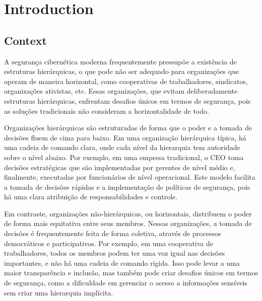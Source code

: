 
%

\chapter{Introduction}
\label{cha:introduction}


% 
% 

\section{Context}
\label{sec:context}

A segurança cibernética moderna frequentemente pressupõe a existência de estruturas hierárquicas,
o que pode não ser adequado para organizações que operam de maneira horizontal, como cooperativas
de trabalhadores, sindicatos, organizações ativistas, etc. Essas organizações, que evitam
deliberadamente estruturas hierárquicas, enfrentam desafios únicos em termos de segurança, pois
as soluções tradicionais não consideram a horizontalidade de todo.

Organizações hierárquicas são estruturadas de forma que o poder e a tomada de decisões fluem de
cima para baixo. Em uma organização hierárquica típica, há uma cadeia de comando clara, onde
cada nível da hierarquia tem autoridade sobre o nível abaixo. Por exemplo, em uma empresa
tradicional, o CEO toma decisões estratégicas que são implementadas por gerentes de nível médio
e, finalmente, executadas por funcionários de nível operacional. Este modelo facilita a tomada
de decisões rápidas e a implementação de políticas de segurança, pois há uma clara atribuição
de responsabilidades e controle.

Em contraste, organizações não-hierárquicas, ou horizontais, distribuem o poder de forma mais
equitativa entre seus membros. Nessas organizações, a tomada de decisões é frequentemente feita
de forma coletiva, através de processos democráticos e participativos. Por exemplo, em uma
cooperativa de trabalhadores, todos os membros podem ter uma voz igual nas decisões importantes,
e não há uma cadeia de comando rígida. Isso pode levar a uma maior transparência e inclusão, mas
também pode criar desafios únicos em termos de segurança, como a dificuldade em gerenciar o acesso
a informações sensíveis sem criar uma hierarquia implícita.

